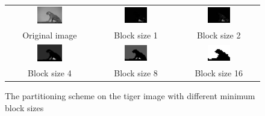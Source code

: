 \documentclass[a4paper]{article}
\begin{document}
\begin{enumerate}
\begin{figure}[H]
\centering
\begin{tabular}{ccc}
    \includegraphics[width=0.3\textwidth]{../lab5ex2/tiger.png} & \includegraphics[width=0.3\textwidth]{../lab5ex2/block-1.png} & \includegraphics[width=0.3\textwidth]{../lab5ex2/block-2.png} \\
    Original image & Block size 1& Block size 2 \\
        \includegraphics[width=0.3\textwidth]{../lab5ex2/block-4.png} & \includegraphics[width=0.3\textwidth]{../lab5ex2/block-8.png} & \includegraphics[width=0.3\textwidth]{../lab5ex2/block-16.png} \\
    Block size 4 & Block size 8& Block size 16 \\
\end{tabular}
\caption{The partitioning scheme on the tiger image with different minimum block sizes}
\label{fig:blocks}
\end{figure}


\end{enumerate}
\end{document}
